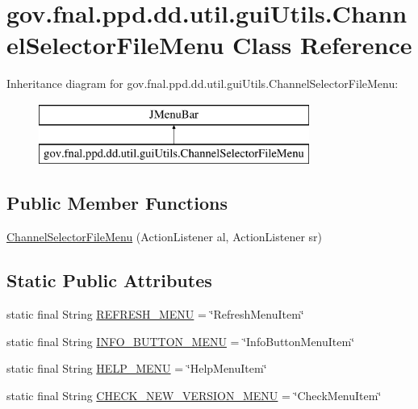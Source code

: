 \hypertarget{classgov_1_1fnal_1_1ppd_1_1dd_1_1util_1_1guiUtils_1_1ChannelSelectorFileMenu}{\section{gov.\-fnal.\-ppd.\-dd.\-util.\-gui\-Utils.\-Channel\-Selector\-File\-Menu Class Reference}
\label{classgov_1_1fnal_1_1ppd_1_1dd_1_1util_1_1guiUtils_1_1ChannelSelectorFileMenu}
}
Inheritance diagram for gov.\-fnal.\-ppd.\-dd.\-util.\-gui\-Utils.\-Channel\-Selector\-File\-Menu\-:\begin{figure}[H]
\begin{center}
\leavevmode
\includegraphics[height=2.000000cm]{classgov_1_1fnal_1_1ppd_1_1dd_1_1util_1_1guiUtils_1_1ChannelSelectorFileMenu}
\end{center}
\end{figure}
\subsection*{Public Member Functions}
\begin{DoxyCompactItemize}
\item 
\hyperlink{classgov_1_1fnal_1_1ppd_1_1dd_1_1util_1_1guiUtils_1_1ChannelSelectorFileMenu_a1059627d950e372132812af611ae266f}{Channel\-Selector\-File\-Menu} (Action\-Listener al, Action\-Listener sr)
\end{DoxyCompactItemize}
\subsection*{Static Public Attributes}
\begin{DoxyCompactItemize}
\item 
static final String \hyperlink{classgov_1_1fnal_1_1ppd_1_1dd_1_1util_1_1guiUtils_1_1ChannelSelectorFileMenu_aa4c2a6d74c7069f6fea17cc166dd1c67}{R\-E\-F\-R\-E\-S\-H\-\_\-\-M\-E\-N\-U} = \char`\"{}Refresh\-Menu\-Item\char`\"{}
\item 
static final String \hyperlink{classgov_1_1fnal_1_1ppd_1_1dd_1_1util_1_1guiUtils_1_1ChannelSelectorFileMenu_a9ea0cc4e03dc70d5fb50d4aff674a8ff}{I\-N\-F\-O\-\_\-\-B\-U\-T\-T\-O\-N\-\_\-\-M\-E\-N\-U} = \char`\"{}Info\-Button\-Menu\-Item\char`\"{}
\item 
static final String \hyperlink{classgov_1_1fnal_1_1ppd_1_1dd_1_1util_1_1guiUtils_1_1ChannelSelectorFileMenu_a0739d248cf2e0fa173654f22ebb410e2}{H\-E\-L\-P\-\_\-\-M\-E\-N\-U} = \char`\"{}Help\-Menu\-Item\char`\"{}
\item 
static final String \hyperlink{classgov_1_1fnal_1_1ppd_1_1dd_1_1util_1_1guiUtils_1_1ChannelSelectorFileMenu_afa4994c94c0697980d1a9644cff93cb9}{C\-H\-E\-C\-K\-\_\-\-N\-E\-W\-\_\-\-V\-E\-R\-S\-I\-O\-N\-\_\-\-M\-E\-N\-U} = \char`\"{}Check\-Menu\-Item\char`\"{}
\end{DoxyCompactItemize}
